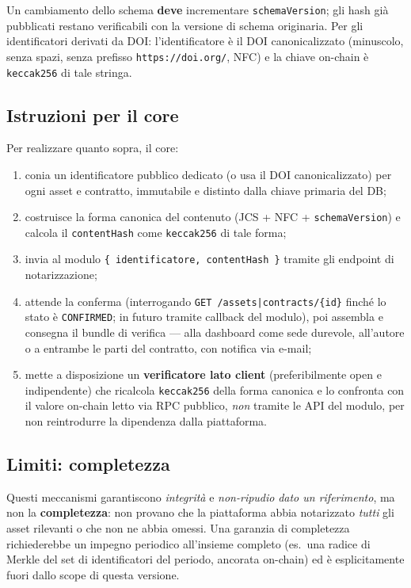 \documentclass[a4paper,11pt]{article}
\begin{document}
\noindent Un cambiamento dello schema \textbf{deve} incrementare \texttt{schemaVersion}; gli hash gi\`a pubblicati restano verificabili con la versione di schema originaria. Per gli identificatori derivati da DOI: l'identificatore \`e il DOI canonicalizzato (minuscolo, senza spazi, senza prefisso \texttt{https://doi.org/}, NFC) e la chiave on-chain \`e \texttt{keccak256} di tale stringa.

\subsection{Istruzioni per il core}

Per realizzare quanto sopra, il core:

\begin{enumerate}[leftmargin=*, itemsep=0.1em]
    \item conia un identificatore pubblico dedicato (o usa il DOI canonicalizzato) per ogni asset e contratto, immutabile e distinto dalla chiave primaria del DB;
    \item costruisce la forma canonica del contenuto (JCS + NFC + \texttt{schemaVersion}) e calcola il \texttt{contentHash} come \texttt{keccak256} di tale forma;
    \item invia al modulo \texttt{\{ identificatore, contentHash \}} tramite gli endpoint di notarizzazione;
    \item attende la conferma (interrogando \texttt{GET /assets|contracts/\{id\}} finch\'e lo stato \`e \texttt{CONFIRMED}; in futuro tramite callback del modulo), poi assembla e consegna il bundle di verifica — alla dashboard come sede durevole, all'autore o a entrambe le parti del contratto, con notifica via e-mail;
    \item mette a disposizione un \textbf{verificatore lato client} (preferibilmente open e indipendente) che ricalcola \texttt{keccak256} della forma canonica e lo confronta con il valore on-chain letto via RPC pubblico, \emph{non} tramite le API del modulo, per non reintrodurre la dipendenza dalla piattaforma.
\end{enumerate}

\subsection{Limiti: completezza}

Questi meccanismi garantiscono \emph{integrit\`a} e \emph{non-ripudio} \emph{dato un riferimento}, ma non la \textbf{completezza}: non provano che la piattaforma abbia notarizzato \emph{tutti} gli asset rilevanti o che non ne abbia omessi. Una garanzia di completezza richiederebbe un impegno periodico all'insieme completo (es.\ una radice di Merkle del set di identificatori del periodo, ancorata on-chain) ed \`e esplicitamente fuori dallo scope di questa versione.
\end{document}
